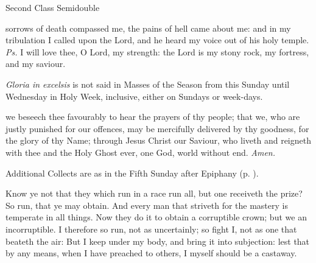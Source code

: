 \begin{inhead}
{Second Class Semidouble}
\end{inhead}
\par\noindent
{}



\properantiphonfix

\introit
{} sorrows of death compassed me, the pains of hell came about me: and in my tribulation I called upon the Lord, and he heard my voice out of his holy temple. \textit{Ps.} I will love thee, O Lord, my strength: the Lord is my stony rock, my fortress, and my saviour.
\begin{rubric}
    \emph{Gloria in excelsis} is not said in Masses of the Season from this Sunday until Wednesday in Holy Week, inclusive, either on Sundays or week-days.
\end{rubric}
\collect
{} we beseech thee favourably to hear the prayers of thy people; that we, who are justly punished for our offences, may be mercifully delivered by thy goodness, for the glory of thy Name; through Jesus Christ our Saviour, who liveth and reigneth with thee and the Holy Ghost ever, one God, world without end. \textit{Amen.}
\begin{rubric}
    Additional Collects are as in the Fifth Sunday after Epiphany (p. \pageref{EpiphanyVCollect}).
\end{rubric}
 Know ye not that they which run in a race run all, but one receiveth the prize? So run, that ye may obtain. And every man that striveth for the mastery is temperate in all things. Now they do it to obtain a corruptible crown; but we an incorruptible. I therefore so run, not as uncertainly; so fight I, not as one that beateth the air: But I keep under my body, and bring it into subjection: lest that by any means, when I have preached to others, I myself should be a castaway.

